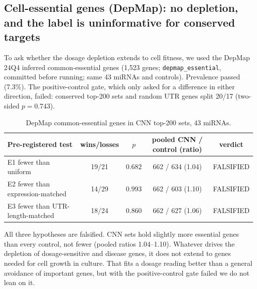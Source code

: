 \subsection{Cell-essential genes (DepMap): no depletion, and the label is uninformative for conserved targets}
To ask whether the dosage depletion extends to cell fitness, we used the DepMap 24Q4 inferred common-essential genes (1,523 genes; \texttt{depmap\_essential}, committed before running; same 43 miRNAs and controls). Prevalence passed (7.3\%). The positive-control gate, which only asked for a difference in either direction, failed: conserved top-200 sets and random UTR genes split 20/17 (two-sided $p=0.743$).
\begin{table}[h]\centering\small\begin{tabular}{lcccc}\hline Pre-registered test & wins/losses & $p$ & pooled CNN / control (ratio) & verdict\\\hline
E1 fewer than uniform & 19/21 & $0.682$ & 662 / 634 (1.04) & FALSIFIED \\
E2 fewer than expression-matched & 14/29 & $0.993$ & 662 / 603 (1.10) & FALSIFIED \\
E3 fewer than UTR-length-matched & 18/24 & $0.860$ & 662 / 627 (1.06) & FALSIFIED \\
\hline\end{tabular}\caption{DepMap common-essential genes in CNN top-200 sets, 43 miRNAs.}\label{tab:depmap}\end{table}
All three hypotheses are falsified. CNN sets hold slightly more essential genes than every control, not fewer (pooled ratios 1.04--1.10). Whatever drives the depletion of dosage-sensitive and disease genes, it does not extend to genes needed for cell growth in culture. That fits a dosage reading better than a general avoidance of important genes, but with the positive-control gate failed we do not lean on it.
